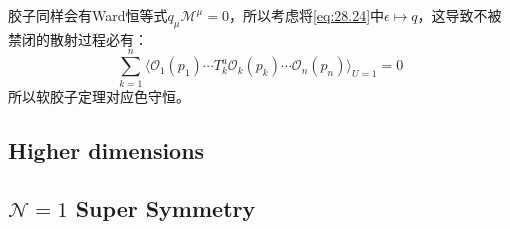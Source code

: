 胶子同样会有Ward恒等式$q_\mu\mathcal{M}^\mu=0$，所以考虑将\ref{eq:28.24}中$\epsilon\mapsto q$，这导致不被禁闭的散射过程必有：
\begin{equation}
	\sum_{k=1}^n\langle\mathcal{O}_{1}(p_{1})\cdots T_k^a\mathcal{O}_k(p_k)\cdots\mathcal{O}_n(p_n)\rangle_{U=1}=0
\end{equation}
所以软胶子定理对应色守恒。
\subsection{Higher dimensions}
\subsection{$\mathcal{N}=1$ Super Symmetry}



